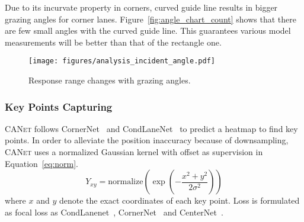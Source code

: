 \documentclass{article}
\newcommand\self{\textsc{CANet}\xspace}
\begin{document}
Due to its incurvate property in corners, curved guide line results in bigger
grazing angles for corner lanes. Figure~\ref{fig:angle_chart_count} shows that
there are few small angles with the curved guide line. This guarantees various
model measurements will be better than that of the rectangle one.

\begin{figure}
  \centering
  \texttt{[image: figures/analysis\_incident\_angle.pdf]}
  \caption{Response range changes with grazing angles.}
  \label{fig:analysis_grazing_angle}
\end{figure}

\subsubsection{Key Points Capturing}
\label{sec:keypoints-catching}
\self follows CornerNet~\cite{cornernet} and CondLaneNet~\cite{condlanenet} to
predict a heatmap to find key points. In order to alleviate the position
inaccuracy because of downsampling, \self uses a normalized Gaussian kernel with
offset as supervision in Equation~\eqref{eq:norm}.
\begin{equation}
  \label{eq:norm}
Y_{xy} = \textrm{normalize}\left(\exp\left(-\frac{x^2+y^2}{2\sigma^2}\right)\right)
\end{equation}
where $x$ and $y$ denote the exact coordinates of each key point. Loss is
formulated as focal loss as
CondLanenet~\cite{condlanenet}, CornerNet~\cite{cornernet} and
CenterNet~\cite{centernet}.
\end{document}
